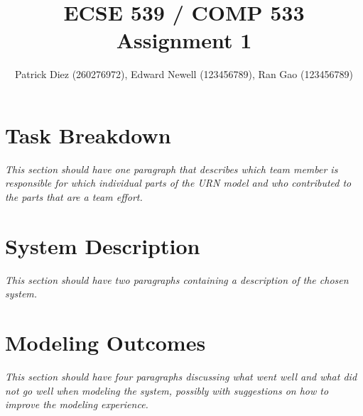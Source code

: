 \documentclass[10pt,fleqn]{article}
\title{ECSE 539 / COMP 533 Assignment 1}
\author{Patrick Diez (260276972), Edward Newell (123456789), Ran Gao (123456789)}
\begin{document}
\maketitle                              %


\section{Task Breakdown}
\textit{This section should have one paragraph that describes which team member is responsible for which individual parts of the URN model and who contributed to the parts that are a team effort.}
%
\section{System Description}
\textit{This section should have two paragraphs containing a description of the chosen system.}
%
\section{Modeling Outcomes}
\textit{This section should have four paragraphs discussing what went well and what did not go well when modeling the system, possibly with suggestions on how to improve the modeling experience.}
\end{document}
